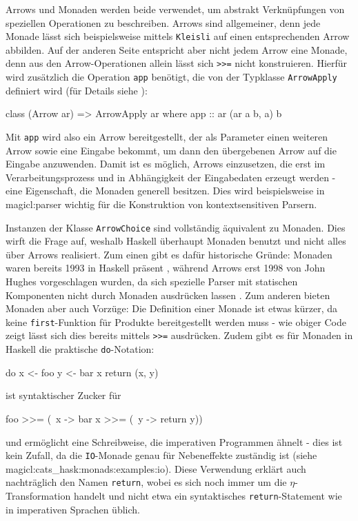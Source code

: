 \documentclass[a4paper, bibgerm]{book}
\newcommand\icode[1]{\lstinline?#1?}
\newcommand\sref{}
\begin{document}
Arrows und Monaden werden beide verwendet, um abstrakt Verknüpfungen von
speziellen Operationen zu beschreiben. Arrows sind allgemeiner, denn
jede Monade lässt sich beispielsweise mittels \icode{Kleisli} auf einen
entsprechenden Arrow abbilden. Auf der anderen Seite entspricht aber
nicht jedem Arrow eine Monade, denn aus den Arrow-Operationen allein
lässt sich \icode{>>=} %
nicht konstruieren. Hierfür wird zusätzlich die Operation \icode{app}
benötigt, die von der Typklasse \icode{ArrowApply} definiert wird (für
Details siehe \cite[S. 18f]{Hughes}):
\begin{code}
class (Arrow ar) => ArrowApply ar where
  app :: ar (ar a b, a) b  
\end{code}
Mit \icode{app} wird also ein Arrow bereitgestellt, der als Parameter
einen weiteren Arrow sowie eine Eingabe bekommt, um dann den übergebenen
Arrow auf die Eingabe anzuwenden. Damit ist es möglich, Arrows
einzusetzen, die erst im Verarbeitungsprozess und in Abhängigkeit der
Eingabedaten erzeugt werden - eine Eigenschaft, die Monaden generell
besitzen. Dies wird beispielsweise in \sref{magicl:parser} wichtig für
die Konstruktion von kontextsensitiven Parsern.

Instanzen der Klasse \icode{ArrowChoice} sind vollständig äquivalent zu
Monaden.  Dies wirft die Frage auf, weshalb Haskell überhaupt Monaden
benutzt und nicht alles über Arrows realisiert. Zum einen gibt es dafür
historische Gründe: Monaden waren bereits 1993 in Haskell präsent
\cite[S.23ff]{HaskellHistory}, während Arrows erst 1998 von John Hughes
vorgeschlagen wurden, da sich spezielle Parser mit statischen
Komponenten nicht durch Monaden ausdrücken lassen \cite{Hughes}. Zum
anderen bieten Monaden aber auch Vorzüge: Die Definition einer Monade
ist etwas kürzer, da keine \icode{first}-Funktion für Produkte
bereitgestellt werden muss - wie obiger Code zeigt lässt sich dies
bereits mittels \icode{>>=} %
ausdrücken. Zudem gibt es für Monaden in Haskell die praktische
\icode{do}-Notation:
\begin{code}
do x <- foo
   y <- bar x
   return (x, y)
\end{code}
ist syntaktischer Zucker für
\begin{code}
foo >>= (\ x ->
  bar x >>= (\ y ->
    return y))          
\end{code} %
und ermöglicht eine Schreibweise, die imperativen Programmen ähnelt -
dies ist kein Zufall, da die \icode{IO}-Monade genau für Nebeneffekte
zuständig ist (siehe \sref{magicl:cats_hask:monads:examples:io}). Diese
Verwendung erklärt auch nachträglich den Namen \icode{return}, wobei es
sich noch immer um die $\eta$-Transformation handelt und nicht etwa ein
syntaktisches \icode{return}-Statement wie in imperativen Sprachen
üblich.
\end{document}
